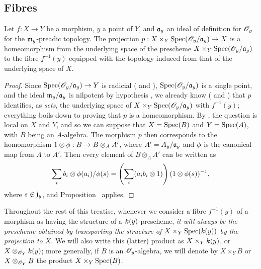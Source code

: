 \subsection{Fibres}
\label{subsection:fibres}

\begin{prop}[3.6.1]
\label{1.3.6.1}
Let $f:X\to Y$ be a morphism, $y$ a point of $Y$, and $\mathfrak{a}_y$ an ideal of definition for $\mathscr{O}_y$ for the $\mathfrak{m}_y$-preadic topology.
The projection $p:X\times_Y\Spec(\OO_y/\fk{a}_y)\to X$ is a homeomorphism from the underlying space of the prescheme $X\times_Y{\mathop{\mathrm{Spec}}\nolimits}(\mathscr{O}_y/\mathfrak{a}_y)$ to the fibre $f^{-1}(y)$ equipped with the topology induced from that of the underlying space of $X$.
\end{prop}

\begin{proof}
\label{proof-1.3.6.1}
Since $\Spec(\OO_y/\fk{a}_y)\to Y$ is radicial ( and ), ${\mathop{\mathrm{Spec}}\nolimits}(\mathscr{O}_y/\mathfrak{a}_y)$ is a single point, and the ideal $\mathfrak{m}_y/\mathfrak{a}_y$ is nilpotent by hypothesis , we already know ( and ) that $p$ identifies, as \emph{sets}, the underlying space of $X\times_Y{\mathop{\mathrm{Spec}}\nolimits}(\mathscr{O}_y/\mathfrak{a}_y)$ with $f^{-1}(y)$; everything boils down to proving that $p$ is a homeomorphism.
By , the question is local on $X$ and $Y$, and so we can suppose that $X={\mathop{\mathrm{Spec}}\nolimits}(B)$ and $Y={\mathop{\mathrm{Spec}}\nolimits}(A)$, with $B$ being an $A$-algebra.
The morphism $p$ then corresponds to the homomorphism $1\otimes\vphi:B\to B\otimes_A A'$, where $A'=A_y/\mathfrak{a}_y$ and $\phi$ is the canonical map from $A$ to $A'$.
Then every element of $B\otimes_A A'$ can be written as
\[
  \sum_i b_i\otimes\phi(a_i)/\phi(s)=\left(\sum_i(a_ib_i\otimes1)\right)(1\otimes\phi(s))^{-1},
\]
where $s\not\in\mathfrak{j}_y$, and Proposition~ applies.
\end{proof}

\begin{env}[3.6.2]
\label{1.3.6.2}
Throughout the rest of this treatise, whenever we consider a fibre $f^{-1}(y)$ of a morphism as having the structure of a $k(y)$-prescheme, \emph{it will always be the prescheme obtained by transporting the structure of $X\times_Y{\mathop{\mathrm{Spec}}\nolimits}(k(y))$ by the projection to $X$}.
We will also write this (latter) product as $X\times_Yk(y)$, or $X\otimes_{\mathscr{O}_Y}k(y)$; more generally, if $B$ is an $\mathscr{O}_y$-algebra, we will denote by $X\times_Y B$ or $X\otimes_{\mathscr{O}_Y}B$ the product $X\times_Y{\mathop{\mathrm{Spec}}\nolimits}(B)$.
\end{env}

